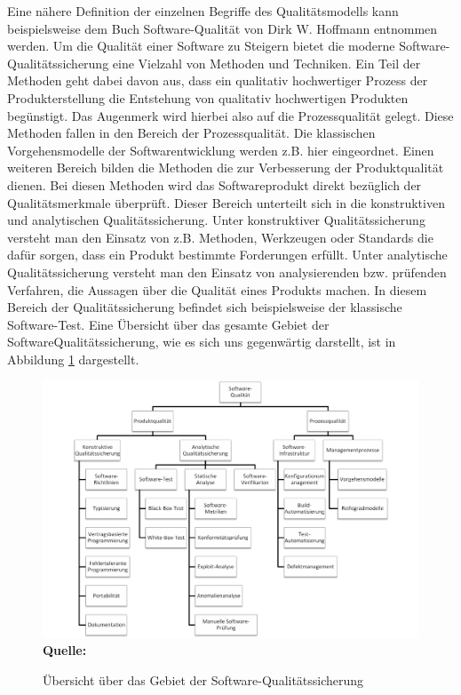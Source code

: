 Eine nähere Definition der einzelnen Begriffe des Qualitätsmodells kann beispielsweise dem Buch Software-Qualität von Dirk W. Hoffmann entnommen werden. \cite[Seite 7 ff.]{hoffmann_software-qualitat_2013}
Um die Qualität einer Software zu Steigern bietet die moderne Software-Qualitätssicherung eine Vielzahl von Methoden und Techniken.
Ein Teil der Methoden geht dabei davon
aus, dass ein qualitativ hochwertiger Prozess der Produkterstellung die Entstehung von qualitativ hochwertigen Produkten begünstigt. Das Augenmerk wird hierbei also auf die Prozessqualität gelegt. Diese Methoden fallen in den Bereich der Prozessqualität.
Die klassischen Vorgehensmodelle der Softwarentwicklung
werden z.B. hier eingeordnet. Einen weiteren Bereich bilden die Methoden die zur Verbesserung der  Produktqualität dienen. Bei diesen Methoden wird das Softwareprodukt direkt bezüglich der Qualitätsmerkmale überprüft. Dieser Bereich unterteilt sich in die konstruktiven und analytischen Qualitätssicherung. Unter konstruktiver Qualitätssicherung versteht man den Einsatz von z.B. Methoden, Werkzeugen oder Standards die
dafür sorgen, dass ein Produkt bestimmte Forderungen erfüllt. 
Unter analytische Qualitätssicherung versteht man den Einsatz von analysierenden bzw. prüfenden Verfahren, die Aussagen
über die Qualität eines Produkts machen.
In diesem Bereich der Qualitätssicherung befindet sich beispielsweise der klassische Software-Test.\cite[vgl. Seite 19 ff.]{hoffmann_software-qualitat_2013} Eine Übersicht über das gesamte Gebiet der SoftwareQualitätssicherung, wie es sich uns gegenwärtig darstellt, ist in Abbildung \ref{fig:softwareQualitätssicherung} dargestellt. 
\begin{figure}[htb]
  \centering  
  \includegraphics[scale=0.7]{img/softwarequalitaet.png}\\
  \footnotesize\sffamily\textbf{Quelle:} \cite[vgl. Seite 20]{hoffmann_software-qualitat_2013}
  \caption{Übersicht über das Gebiet der Software-Qualitätssicherung}
  \label{fig:softwareQualitätssicherung}
\end{figure}



